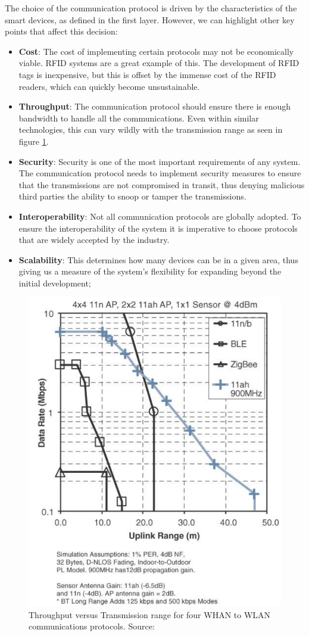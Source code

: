 
The choice of the communication protocol is driven by the characteristics of the smart devices, as defined in the first layer. However, we can highlight other key points that affect this decision:

\begin{itemize}
    \item \textbf{Cost}: The cost of implementing certain protocols may not be economically viable. \acs{RFID} systems are a great example of this. The development of \acs{RFID} tags is inexpensive, but this is offset by the immense cost of the \acs{RFID} readers, which can quickly become unsustainable.
    \item \textbf{Throughput}: The communication protocol should ensure there is enough bandwidth to handle all the communications. Even within similar technologies, this can vary wildly with the transmission range as seen in figure \ref{fig:communication-protocols-throughput}.
    \item \textbf{Security}: Security is one of the most important requirements of any system. The communication protocol needs to implement security measures to ensure that the transmissions are not compromised in transit, thus denying malicious third parties the ability to snoop or tamper the transmissions.
    \item \textbf{Interoperability}: Not all communication protocols are globally adopted. To ensure the interoperability of the system it is imperative to choose protocols that are widely accepted by the industry.
    \item \textbf{Scalability}: This determines how many devices can be in a given area, thus giving us a measure of the system's flexibility for expanding beyond the initial development;
\end{itemize}

\begin{figure}[H]
    \centering
    \includegraphics[width=0.55\linewidth]{images/communication-protocols-throughput.png}
    \caption{Throughput versus Transmission range for four WHAN to WLAN communications protocols. Source: \cite{10.5555/3161403}}
    \label{fig:communication-protocols-throughput}
\end{figure}


